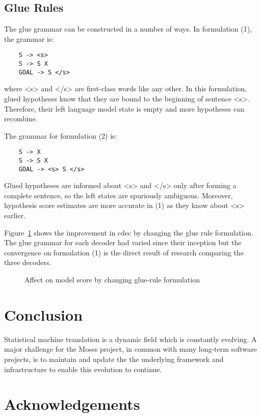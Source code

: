 \documentclass{pbml}
\begin{document}
\subsection{Glue Rules}

The glue grammar can be constructed in a number of ways. In formulation (1), the grammar is:
 \begin{verbatim}
    S -> <s>
    S -> S X
    GOAL -> S </s> 
 \end{verbatim}
 where <s> and </s> are first-class words like any other. In this formulation, glued hypotheses know that they are bound to the beginning of sentence <s>.  Therefore, their left language model state is empty and more hypotheses can recombine.  
 
The grammar for formulation (2) is:
 \begin{verbatim}
    S -> X
    S -> S X
    GOAL -> <s> S </s> 
 \end{verbatim}
Glued hypotheses are informed about <s> and </s> only after forming a complete sentence, so the left states are spuriously ambiguous.  Moreover, hypothesis score estimates are more accurate in (1) as they know about <s> earlier. 

Figure~\ref{fig:glue} shows the improvement in cdec by changing the glue rule formulation. The glue grammar for each decoder had varied since their inception but the convergence on formulation (1) is the direct result of research comparing the three decoders.

 \begin{figure}[h]
 \begin{center}
 
 \end{center}
 \caption{Affect on model score by changing glue-rule formulation}
 \label{fig:glue}
 \end{figure}


\section{Conclusion}

Statistical machine translation is a dynamic field which is constantly evolving. A major challenge for the Moses project, in common with many long-term software projects, is to maintain and update the the underlying framework and infrastructure to enable this evolution to continue. 


\section*{Acknowledgements}
\end{document}
